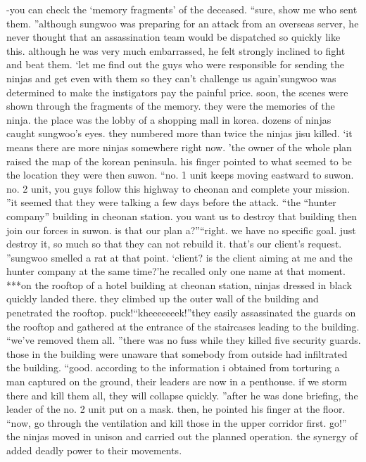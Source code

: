 -you can check the ‘memory fragments’ of the deceased.
“sure, show me who sent them.
”although sungwoo was preparing for an attack from an overseas server, he never thought that an assassination team would be dispatched so quickly like this.
 although he was very much embarrassed, he felt strongly inclined to fight and beat them.
‘let me find out the guys who were responsible for sending the ninjas and get even with them so they can’t challenge us again’sungwoo was determined to make the instigators pay the painful price.
soon, the scenes were shown through the fragments of the memory.
 they were the memories of the ninja.
 the place was the lobby of a shopping mall in korea.
 dozens of ninjas caught sungwoo’s eyes.
 they numbered more than twice the ninjas jisu killed.
‘it means there are more ninjas somewhere right now.
’the owner of the whole plan raised the map of the korean peninsula.
 his finger pointed to what seemed to be the location they were then suwon.
“no.
 1 unit keeps moving eastward to suwon.
 no.
 2 unit, you guys follow this highway to cheonan and complete your mission.
”it seemed that they were talking a few days before the attack.
“the “hunter company” building in cheonan station.
 you want us to destroy that building then join our forces in suwon.
 is that our plan a?”“right.
 we have no specific goal.
 just destroy it, so much so that they can not rebuild it.
 that’s our client’s request.
”sungwoo smelled a rat at that point.
‘client? is the client aiming at me and the hunter company at the same time?’he recalled only one name at that moment.
***on the rooftop of a hotel building at cheonan station, ninjas dressed in black quickly landed there.
 they climbed up the outer wall of the building and penetrated the rooftop.
puck!“kheeeeeeek!”they easily assassinated the guards on the rooftop and gathered at the entrance of the staircases leading to the building.
“we’ve removed them all.
”there was no fuss while they killed five security guards.
 those in the building were unaware that somebody from outside had infiltrated the building.
“good.
 according to the information i obtained from torturing a man captured on the ground, their leaders are now in a penthouse.
 if we storm there and kill them all, they will collapse quickly.
”after he was done briefing, the leader of the no.
 2 unit put on a mask.
 then, he pointed his finger at the floor.
“now, go through the ventilation and kill those in the upper corridor first.
 go!”
the ninjas moved in unison and carried out the planned operation.
 the synergy of  added deadly power to their movements.
